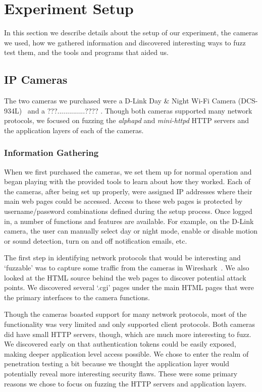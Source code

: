 \documentclass[letterpaper,twocolumn,10pt]{article}
\begin{document}
\section{Experiment Setup}
In this section we describe details about the setup of our experiment, the
cameras we used, how we gathered information and discovered interesting ways to fuzz test them, and the tools and programs that aided us.  

\subsection{IP Cameras}
The two cameras we purchased were a D-Link Day \& Night Wi-Fi Camera (DCS-934L)~\cite{dlinkCam} and a ???..............???? . Though both cameras supported many network protocols, we focused on fuzzing the \textit{alphapd} and \textit{mini-httpd} HTTP servers and the application layers of each of the cameras. 


\subsubsection{Information Gathering}
When we first purchased the cameras, we set them up for normal operation and began playing with the provided tools to learn about how they worked. Each of the cameras, after being set up properly, were assigned IP addresses where their main web pages could be accessed. Access to these web pages is protected by username/password combinations defined during the setup process. Once logged in, a number of functions and features are available. For example, on the D-Link camera, the user can manually select day or night mode, enable or disable motion or sound detection, turn on and off notification emails, etc. 

The first step in identifying network protocols that would be interesting and `fuzzable' was to capture some traffic from the cameras in Wireshark~\cite{wireshark}. We also looked at the HTML source behind the web pages to discover potential attack points. We discovered several `.cgi' pages under the main HTML pages that were the primary interfaces to the camera functions. 

Though the cameras boasted support for many network protocols, most of the functionality was very limited and only supported client protocols. Both cameras did have small HTTP servers, though, which are much more interesting to fuzz. We discovered early on that authentication tokens could be easily exposed, making deeper application level access possible. We chose to enter the realm of penetration testing a bit because we thought the application layer would potentially reveal more interesting security flaws.  These were some primary reasons we chose to focus on fuzzing the HTTP servers and application layers. 
\end{document}
